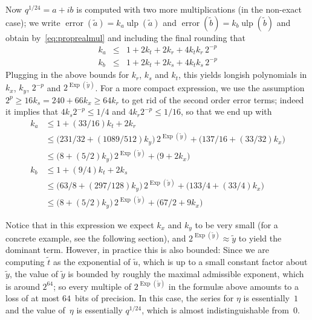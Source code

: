 \documentclass [11pt]{article}
\newcommand {\appro}[1]{\widetilde {#1}}
\newcommand {\Ulp}{{\operatorname {ulp}}}
\DeclareMathOperator{\Exp}{\operatorname {Exp}}
\newcommand{\error}{\operatorname {error}}
\renewcommand {\leq}{\leqslant}
\renewcommand {\geq}{\geqslant}
\begin{document}
Now $q^{1/24} = a + i b$ is computed with two more multiplications
(in the non-exact case); we write
$\error (\appro a) = k_a \Ulp (\appro a)$ and
$\error (\appro b) = k_b \Ulp (\appro b)$ and
obtain by~\eqref {eq:proprealmul} and including the final rounding that
\begin {eqnarray*}
k_a
& \leq & 1 + 2 k_t + 2 k_r + 4 k_t k_r \, 2^{-p} \\
k_b
& \leq & 1 + 2 k_t + 2 k_s + 4 k_t k_s \, 2^{-p}
\end {eqnarray*}
Plugging in the above bounds for $k_r$, $k_s$ and $k_t$, this yields
longish polynomials in $k_x$, $k_y$, $2^{-p}$ and $2^{\Exp (\appro y)}$.
For a more compact expression, we use the assumption
$2^p \geq 16 k_s = 240 + 66 k_x \geq 64 k_r$
to get rid of the second order error terms; indeed it implies that
$4 k_s 2^{-p} \leq 1/4$ and $4 k_r 2^{-p} \leq 1/16$, so that we end up with
\begin {equation}
\label {eq:qfromz}
\begin {aligned}
k_a
& \leq 1 + (33/16) k_t + 2 k_r \\
& \leq \big( 231/32 + (1089/512) k_y \big) \, 2^{\Exp (\appro y)}
         + \big( 137/16 + (33/32) k_x \big) \\
& \leq \big( 8 + (5/2) k_y \big) \, 2^{\Exp (\appro y)}
         + \big( 9 + 2 k_x \big) \\
k_b
& \leq 1 + (9/4) k_t + 2 k_s \\
& \leq \big( 63/8 + (297/128) k_y \big) \, 2^{\Exp (\appro y)}
         + \big( 133/4 + (33/4) k_x \big) \\
& \leq \big( 8 + (5/2) k_y \big) \, 2^{\Exp (\appro y)}
         + \big( 67/2 + 9 k_x \big)
\end {aligned}
\end {equation}

Notice that in this expression we expect $k_x$ and $k_y$ to be very small
(for a concrete example, see the following section), and
$2^{\Exp (\appro y)} \approx \appro y$ to yield the dominant term.
However, in practice this is also bounded:
Since we are computing $\appro t$ as the exponential of $\appro u$, which
is up to a small constant factor about $\appro y$, the value of
$\appro y$ is bounded by roughly the maximal admissible exponent, which
is around $2^{64}$; so every multiple of $2^{\Exp (\appro y)}$ in the
formul{\ae} above amounts to a loss of at most $64$~bits of precision.
In this case, the series for $\eta$ is essentially~$1$ and the value
of~$\eta$ is essentially $q^{1/24}$, which is almost indistinguishable
from~$0$.
\end{document}
